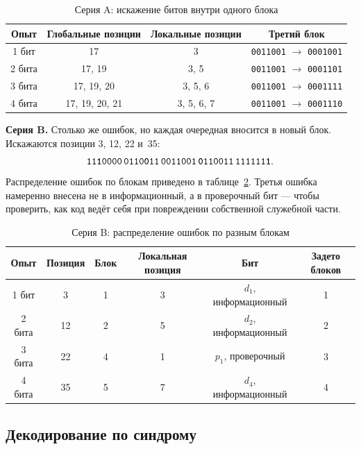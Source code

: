 \documentclass[a4paper,14pt]{extarticle}
\begin{document}
\begin{table}[H]
\caption{Серия A: искажение битов внутри одного блока}
\label{tab:spoilA}
\centering\footnotesize\setlength{\tabcolsep}{8pt}
\begin{tabular}{c|c|c|c}
\toprule
Опыт & Глобальные позиции & Локальные позиции & Третий блок \\
\midrule
1 бит & 17 & 3 & \texttt{0011001} $\to$ \texttt{0001001} \\
2 бита & 17, 19 & 3, 5 & \texttt{0011001} $\to$ \texttt{0001101} \\
3 бита & 17, 19, 20 & 3, 5, 6 & \texttt{0011001} $\to$ \texttt{0001111} \\
4 бита & 17, 19, 20, 21 & 3, 5, 6, 7 & \texttt{0011001} $\to$ \texttt{0001110} \\
\bottomrule
\end{tabular}
\end{table}

\textbf{Серия B.} Столько же ошибок, но каждая очередная вносится в новый блок.
Искажаются позиции 3, 12, 22 и~35:
\begin{equation}
  \texttt{11\textbf{1}0000\,0110\textbf{0}11\,0011001\,\textbf{0}110011\,111111\textbf{1}}.
\end{equation}
Распределение ошибок по блокам приведено в таблице~\ref{tab:spoilB}. Третья ошибка
намеренно внесена не в информационный, а в проверочный бит --- чтобы проверить, как
код ведёт себя при повреждении собственной служебной части.

\begin{table}[H]
\caption{Серия B: распределение ошибок по разным блокам}
\label{tab:spoilB}
\centering\footnotesize\setlength{\tabcolsep}{6pt}
\begin{tabular}{c|c|c|c|c|c}
\toprule
Опыт & Позиция & Блок & Локальная позиция & Бит & Задето блоков \\
\midrule
1 бит & 3 & 1 & 3 & $d_1$, информационный & 1 \\
2 бита & 12 & 2 & 5 & $d_2$, информационный & 2 \\
3 бита & 22 & 4 & 1 & $p_1$, проверочный & 3 \\
4 бита & 35 & 5 & 7 & $d_4$, информационный & 4 \\
\bottomrule
\end{tabular}
\end{table}

\subsection{Декодирование по синдрому}
\end{document}

